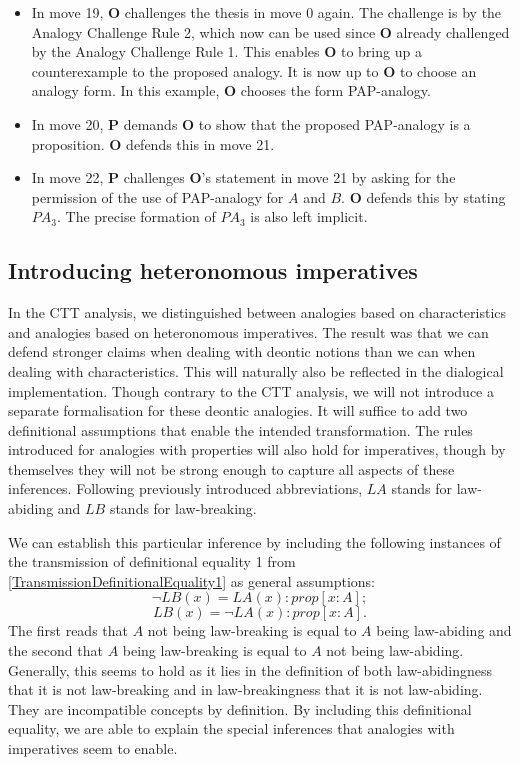 \begin{itemize}
				\item In move 19, \textbf{O} challenges the thesis in move 0 again. The challenge is by the Analogy Challenge Rule 2, which now can be used since \textbf{O} already challenged by the Analogy Challenge Rule 1. This enables \textbf{O} to bring up a counterexample to the proposed analogy. It is now up to \textbf{O} to choose an analogy form. In this example, \textbf{O} chooses the form PAP-analogy. 
				\item In move 20, \textbf{P} demands \textbf{O} to show that the proposed PAP-analogy is a proposition. \textbf{O} defends this in move 21. 
				\item In move 22, \textbf{P} challenges \textbf{O}'s statement in move 21 by asking for the permission of the use of PAP-analogy for $A$ and $B$. \textbf{O} defends this by stating $PA_3$. The precise formation of $PA_3$ is also left implicit.
			\end{itemize}
		
		
		
			
	\subsection{Introducing heteronomous imperatives}	


		In the CTT analysis, we distinguished between analogies based on characteristics and analogies based on heteronomous imperatives. The result was that we can defend stronger claims when dealing with deontic notions than we can when dealing with characteristics. This will naturally also be reflected in the dialogical implementation. Though contrary to the CTT analysis, we will not introduce a separate formalisation for these deontic analogies. It will suffice to add two definitional assumptions that enable the intended transformation. The rules introduced for analogies with properties will also hold for imperatives, though by themselves they will not be strong enough to capture all aspects of these inferences. Following previously introduced abbreviations, $LA$ stands for law-abiding and $LB$ stands for law-breaking.
		
		We can establish this particular inference by including the following instances of the transmission of definitional equality 1 from \autoref{TransmissionDefinitionalEquality1} as general assumptions:
			\[ 
				\neg LB(x) = LA(x) : prop [x : A];
			\]
			\[
				LB(x) = \neg LA(x) : prop [x : A]. 
			\]
		The first reads that $A$ not being law-breaking is equal to $A$ being law-abiding and the second that $A$ being law-breaking is equal to $A$ not being law-abiding. Generally, this seems to hold as it lies in the definition of both law-abidingness that it is not law-breaking and in law-breakingness that it is not law-abiding. They are incompatible concepts by definition. By including this definitional equality, we are able to explain the special inferences that analogies with imperatives seem to enable. 
		
